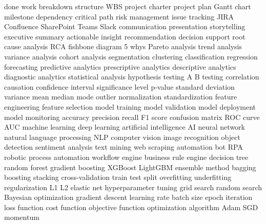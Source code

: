 \documentclass[a4paper,10pt]{article}
\begin{document}
{done work breakdown structure WBS project charter project plan Gantt chart milestone dependency critical path risk management issue tracking JIRA Confluence SharePoint Teams Slack communication presentation storytelling executive summary actionable insight recommendation decision support root cause analysis RCA fishbone diagram 5 whys Pareto analysis trend analysis variance analysis cohort analysis segmentation clustering classification regression forecasting predictive analytics prescriptive analytics descriptive analytics diagnostic analytics statistical analysis hypothesis testing A B testing correlation causation confidence interval significance level p-value standard deviation variance mean median mode outlier normalization standardization feature engineering feature selection model training model validation model deployment model monitoring accuracy precision recall F1 score confusion matrix ROC curve AUC machine learning deep learning artificial intelligence AI neural network natural language processing NLP computer vision image recognition object detection sentiment analysis text mining web scraping automation bot RPA robotic process automation workflow engine business rule engine decision tree random forest gradient boosting XGBoost LightGBM ensemble method bagging boosting stacking cross-validation train test split overfitting underfitting regularization L1 L2 elastic net hyperparameter tuning grid search random search Bayesian optimization gradient descent learning rate batch size epoch iteration loss function cost function objective function optimization algorithm Adam SGD momentum}
\end{document}
